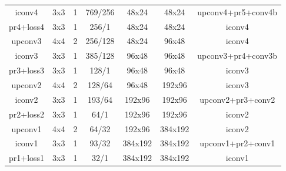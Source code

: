 \begin{table}[htbp]
\begin{small}
\begin{tabular*}{\textwidth}{@{\extracolsep{\fill}}c|ccc|cc|c}
			iconv4        & 3x3 & 1 & 769/256  & 48x24     & 48x24    & upconv4+pr5+conv4b \\
			pr4+loss4 & 3x3 & 1  & 256/1       & 48x24     & 48x24    & iconv4 \\
			upconv3    & 4x4 & 2 & 256/128  & 48x24     & 96x48    & iconv4 \\
			iconv3        & 3x3 & 1 & 385/128  & 96x48    & 96x48    & upconv3+pr4+conv3b \\
			pr3+loss3 & 3x3 & 1 & 128/1        & 96x48    & 96x48    & iconv3 \\
			upconv2    & 4x4 & 2 & 128/64    & 96x48    & 192x96   & iconv3 \\
			iconv2        & 3x3 & 1 & 193/64   & 192x96   & 192x96   & upconv2+pr3+conv2 \\
			pr2+loss2  & 3x3 & 1 & 64/1        & 192x96   & 192x96    & iconv2 \\
			upconv1     & 4x4 & 2 & 64/32    & 192x96    & 384x192 & iconv2 \\
			iconv1        & 3x3 & 1 & 93/32     &384x192  & 384x192 & upconv1+pr2+conv1 \\
			pr1+loss1  & 3x3 & 1 & 32/1         & 384x192 & 384x192 & iconv1 \\ \bottomrule[2pt]
		\end{tabular*}
    \end{small}
\end{table}

